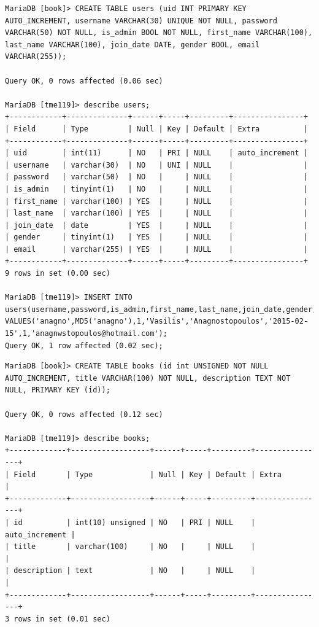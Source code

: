 \documentclass{assignment}
\begin{document}
\begin{verbatim}
MariaDB [book]> CREATE TABLE users (uid INT PRIMARY KEY AUTO_INCREMENT, username VARCHAR(30) UNIQUE NOT NULL, password VARCHAR(50) NOT NULL, is_admin BOOL NOT NULL, first_name VARCHAR(100), last_name VARCHAR(100), join_date DATE, gender BOOL, email VARCHAR(255));

Query OK, 0 rows affected (0.06 sec)

MariaDB [tme119]> describe users;
+------------+--------------+------+-----+---------+----------------+
| Field      | Type         | Null | Key | Default | Extra          |
+------------+--------------+------+-----+---------+----------------+
| uid        | int(11)      | NO   | PRI | NULL    | auto_increment |
| username   | varchar(30)  | NO   | UNI | NULL    |                |
| password   | varchar(50)  | NO   |     | NULL    |                |
| is_admin   | tinyint(1)   | NO   |     | NULL    |                |
| first_name | varchar(100) | YES  |     | NULL    |                |
| last_name  | varchar(100) | YES  |     | NULL    |                |
| join_date  | date         | YES  |     | NULL    |                |
| gender     | tinyint(1)   | YES  |     | NULL    |                |
| email      | varchar(255) | YES  |     | NULL    |                |
+------------+--------------+------+-----+---------+----------------+
9 rows in set (0.00 sec)

MariaDB [tme119]> INSERT INTO users(username,password,is_admin,first_name,last_name,join_date,gender,email) VALUES('anagno',MD5('anagno'),1,'Vasilis','Anagnostopoulos','2015-02-15',1,'anagnwstopoulos@hotmail.com');
Query OK, 1 row affected (0.02 sec);
\end{verbatim}

\begin{verbatim}
MariaDB [book]> CREATE TABLE books (id int UNSIGNED NOT NULL AUTO_INCREMENT, title VARCHAR(100) NOT NULL, description TEXT NOT NULL, PRIMARY KEY (id));

Query OK, 0 rows affected (0.12 sec)

MariaDB [tme119]> describe books;
+-------------+------------------+------+-----+---------+----------------+
| Field       | Type             | Null | Key | Default | Extra          |
+-------------+------------------+------+-----+---------+----------------+
| id          | int(10) unsigned | NO   | PRI | NULL    | auto_increment |
| title       | varchar(100)     | NO   |     | NULL    |                |
| description | text             | NO   |     | NULL    |                |
+-------------+------------------+------+-----+---------+----------------+
3 rows in set (0.01 sec)
\end{verbatim}
\end{document}
